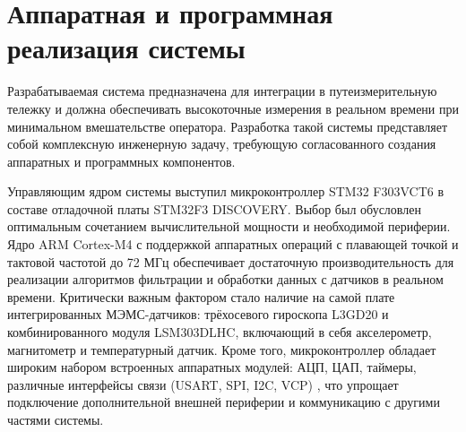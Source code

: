 \chapter{Аппаратная и программная реализация системы}
\label{chap:main_part}

Разрабатываемая система предназначена для интеграции в путеизмерительную тележку и должна обеспечивать высокоточные измерения в реальном времени при минимальном вмешательстве оператора. Разработка такой системы представляет собой комплексную инженерную задачу, требующую согласованного создания аппаратных и программных компонентов.

Управляющим ядром системы выступил микроконтроллер STM32 F303VCT6 в составе отладочной платы STM32F3 DISCOVERY. Выбор был обусловлен оптимальным сочетанием вычислительной мощности и необходимой периферии. Ядро ARM Cortex-M4 с поддержкой аппаратных операций с плавающей точкой и тактовой частотой до 72 МГц \cite{stm32rm0316} обеспечивает достаточную производительность для реализации алгоритмов фильтрации и обработки данных с датчиков в реальном времени. Критически важным фактором стало наличие на самой плате интегрированных МЭМС-датчиков: трёхосевого гироскопа L3GD20 и комбинированного модуля LSM303DLHC, включающий в себя акселерометр, магнитометр и температурный датчик. Кроме того, микроконтроллер обладает широким набором встроенных аппаратных модулей: АЦП, ЦАП, таймеры, различные интерфейсы связи (USART, SPI, I2C, VCP) \cite{stm32rm0316}, что упрощает подключение дополнительной внешней периферии и коммуникацию с другими частями системы.








%
%
